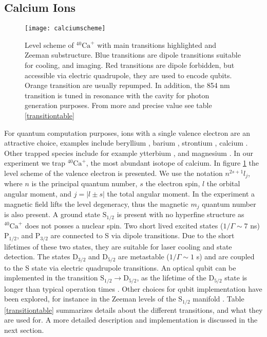 \subsection{Calcium Ions}
\label{sec:calciumion}
\begin{figure}
\centering
\texttt{[image: calciumscheme]}
\caption{Level scheme of $^{40}\text{Ca}^+$ with main transitions highlighted and Zeeman substructure. Blue transitions are dipole transitions suitable for cooling, and imaging. Red transitions are dipole forbidden, but accessible via electric quadrupole, they are used to encode qubits. Orange transition are usually repumped. In addition, the 854 nm transition is tuned in resonance with the cavity for photon generation purposes. From more and precise value see table \ref{transitiontable}}
\label{calciumscheme}
\end{figure}
For quantum computation purposes, ions with a single valence electron are an attractive choice, examples include beryllium \cite{beryllium}, barium \cite{barium}, strontium \cite{strontium}, calcium \cite{calcium}. Other trapped species include for example ytterbium \cite{PhysRevA.44.R20}, and magnesium \cite{magnesium}. In our experiment we trap $^{40}\text{Ca}^+$, the most abundant isotope of calcium. In figure \ref{calciumscheme} the level scheme of the valence electron is presented. We use the notation $n^{2s+1}l_j$, where $n$ is the principal quantum number, $s$ the electron spin, $l$ the orbital angular moment, and $j = |l\pm s|$ the total angular moment. In the experiment a magnetic field lifts the level degeneracy, thus the magnetic $m_j$ quantum number is also present. A ground state $\text{S}_{1/2}$ is present with no hyperfine structure as $^{40}\text{Ca}^+$ does not posses a nuclear spin. Two short lived excited states ($1/\Gamma \sim 7$ ns) $\text{P}_{1/2}$, and $\text{P}_{3/2}$ are connected to S via dipole transitions. Due to the short lifetimes of these two states, they are suitable for laser cooling and state detection.
 The states $\text{D}_{3/2}$ and $\text{D}_{5/2}$ are metastable ($ 1/\Gamma \sim 1$ s) and are coupled to the S state via electric quadrupole transitions. An optical qubit can be implemented in the transition $\text{S}_{1/2} \to \text{D}_{5/2}$, as the lifetime of the $\text{D}_{5/2}$ state is longer than typical operation times \cite{calciumqubit}. Other choices for qubit implementation have been explored, for instance in the Zeeman levels of the $\text{S}_{1/2}$ manifold \cite{Ruster2016}. Table \ref{transitiontable} summarizes details about the different transitions, and what they are used for. A more detailed description and implementation is discussed in the next section.

